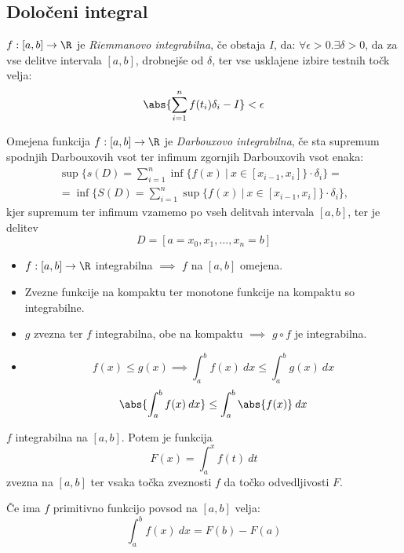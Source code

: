 \documentclass[12pt, a4paper, unicode]{article}
\begin{document}
\subsection{Določeni integral}

\begin{definicija}
$f:[a,b] \to \R$ je \textit{Riemmanovo integrabilna}, če obstaja $I$, da: $\forall \epsilon > 0$.$\exists \delta > 0$, da za vse delitve intervala $[a,b]$, drobnejše od $\delta$, ter vse usklajene izbire testnih točk velja: $$\abs{\sum_{i=1}^{n} f(t_i)\delta_i - I} < \epsilon$$

Omejena funkcija $f:[a,b] \to \R$ je \textit{Darbouxovo integrabilna}, če sta supremum spodnjih Darbouxovih vsot ter infimum zgornjih Darbouxovih vsot enaka:
\begin{align*}
\sup\{s(D) = \sum_{i=1}^{n} \inf\{f(x) \: | \: x \in [x_{i-1}, x_i]\} \cdot  \delta_i \} = \\
= \inf\{S(D) = \sum_{i=1}^{n} \sup\{f(x) \: | \: x \in [x_{i-1}, x_i]\} \cdot  \delta_i \},
\end{align*}
kjer supremum ter infimum vzamemo po vseh delitvah intervala $[a,b]$, ter je delitev $$D = [a = x_0, x_1, \dots, x_n = b]$$
\end{definicija}

\begin{izrek}
\begin{itemize}
    \item $f:[a,b] \to \R$ integrabilna $\implies$ $f$ na $[a,b]$ omejena.
    \item Zvezne funkcije na kompaktu ter monotone funkcije na kompaktu so integrabilne.
    \item $g$ zvezna ter $f$ integrabilna, obe na kompaktu $\implies$ $g \circ f$ je integrabilna.
    \item $$f(x) \leq g(x) \implies \int_{a}^{b} f(x) \: dx \leq \int_{a}^{b} g(x) \: dx$$
$$\abs{\int_{a}^{b} f(x) \: dx} \leq \int_{a}^{b} \abs{f(x)} \: dx$$
\end{itemize}
\end{izrek}

\begin{izrek}
$f$ integrabilna na $[a,b]$. Potem je funkcija $$F(x) = \int_{a}^{x} f(t) \: dt$$ zvezna na $[a,b]$ ter vsaka točka zveznosti $f$ da točko odvedljivosti $F$.

Če ima $f$ primitivno funkcijo povsod na $[a,b]$ velja: $$\int_{a}^{b} f(x) \: dx = F(b) - F(a)$$
\end{izrek}
\end{document}

